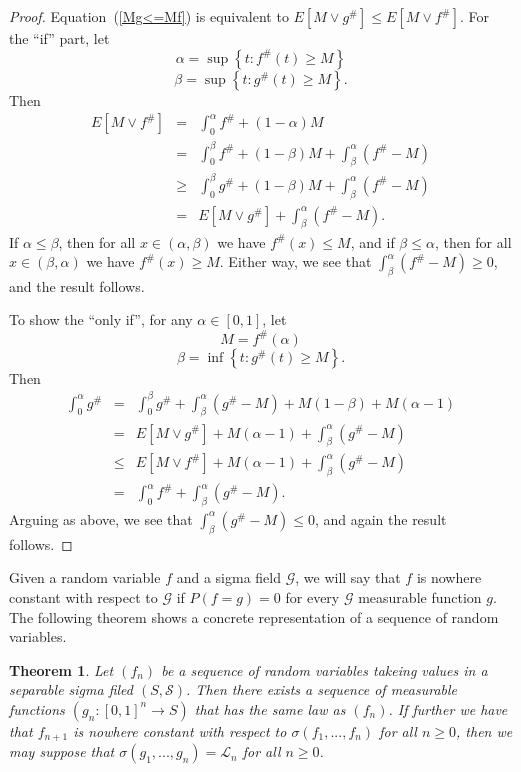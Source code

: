 \documentclass[12pt]{amsart}
\newtheorem{thm}{Theorem}
\begin{document}
\begin{proof}
Equation~(\ref{Mg<=Mf}) is equivalent to
$E \left[ M \vee g^\#  \right] \leq E \left[M \vee f^\# \right]$.
For the ``if'' part, let
\[\alpha =\sup \left\{t:f^\# (t) \geq M \right\}\]
\[\beta =\sup \left\{t:g^\# (t)\geq M \right\}.\]
Then
\begin{eqnarray*}
E \left[ M \vee f^\#\right] 
&=&
\int_0^\alpha f^\#  + (1-\alpha)M \\
&=&
\int_0^\beta f^\# + (1-\beta)M + \int_\beta^\alpha (f^\#-M) \\
&\ge&
\int_0^\beta g^\# + (1-\beta)M + \int_\beta^\alpha (f^\#-M) \\
&=&
E \left[ M \vee g^\# \right] + \int_\beta^\alpha (f^\#-M) .
\end{eqnarray*}
If $\alpha \le \beta$, then for all $x \in (\alpha,\beta)$ we have
$f^\#(x) \le M$, and if $\beta \le \alpha$, then for all $x \in (\beta,\alpha)$
we have $f^\#(x) \ge M$.  Either way, we see that
$\int_\beta^\alpha (f^\#-M) \ge 0$, and the result follows.

To show the ``only if'', for any $\alpha \in [0,1]$, let 
\[M=f^\#(\alpha)\]
\[\beta =\inf \left\{t:g^\# (t)\geq M \right\}.\]
Then
\begin{eqnarray*}
\int_0^\alpha g^\#
&=&
\int_0^\beta g^\# + \int_\beta^\alpha (g^\#-M) + M(1-\beta) + M(\alpha-1) \\
&=&
E \left[ M \vee g^\# \right] + M(\alpha-1) + \int_\beta^\alpha (g^\#-M) \\
&\le&
E \left[ M \vee f^\# \right] + M(\alpha-1) + \int_\beta^\alpha (g^\#-M) \\
&=&
\int_0^\alpha f^\# + \int_\beta^\alpha (g^\#-M) .
\end{eqnarray*}
Arguing as above, we see that $\int_\beta^\alpha (g^\#-M) \le 0$, and again
the result follows.
\end{proof}

Given a random variable $f$ and a sigma field $\mathcal{G}$, we
will say that $f$ is nowhere constant with respect to
$\mathcal{G}$ if $P(f=g)=0$ for every $\mathcal{G}$ measurable
function $g$. The following theorem \cite{M2} shows a concrete
representation of a sequence of random variables.

\begin{thm}
\label{t concrete}
Let $(f_n)$ be a sequence of random variables takeing values in a
separable sigma filed $(S,\mathcal{S})$. Then there exists a
sequence of measurable functions $(g_n:[0,1]^{n}\rightarrow S)$
that has the same law as $(f_n)$. If further we have that
$f_{n+1}$ is nowhere constant with respect to
$\sigma(f_1,...,f_n)$ for all $n \geq 0$, then we may suppose that
$\sigma(g_1,...,g_n)=\mathcal{L}_n$ for all $n \geq 0$.
\end{thm}
\end{document}
